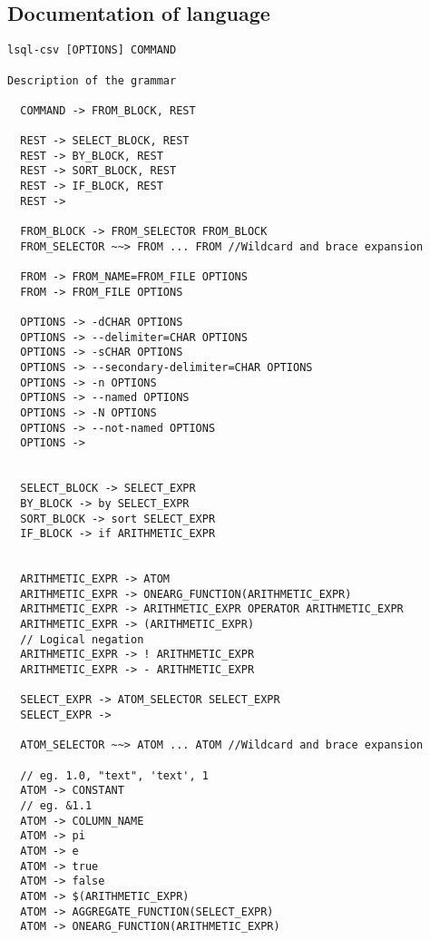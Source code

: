 \subsection{Documentation of language}
\begin{verbatim}
lsql-csv [OPTIONS] COMMAND
      
Description of the grammar
  
  COMMAND -> FROM_BLOCK, REST
                            
  REST -> SELECT_BLOCK, REST 
  REST -> BY_BLOCK, REST   
  REST -> SORT_BLOCK, REST 
  REST -> IF_BLOCK, REST   
  REST ->
  
  FROM_BLOCK -> FROM_SELECTOR FROM_BLOCK
  FROM_SELECTOR ~~> FROM ... FROM //Wildcard and brace expansion
  
  FROM -> FROM_NAME=FROM_FILE OPTIONS
  FROM -> FROM_FILE OPTIONS
  
  OPTIONS -> -dCHAR OPTIONS
  OPTIONS -> --delimiter=CHAR OPTIONS
  OPTIONS -> -sCHAR OPTIONS
  OPTIONS -> --secondary-delimiter=CHAR OPTIONS
  OPTIONS -> -n OPTIONS  
  OPTIONS -> --named OPTIONS
  OPTIONS -> -N OPTIONS   
  OPTIONS -> --not-named OPTIONS
  OPTIONS ->
  
  
  SELECT_BLOCK -> SELECT_EXPR
  BY_BLOCK -> by SELECT_EXPR
  SORT_BLOCK -> sort SELECT_EXPR                                                                                                                              
  IF_BLOCK -> if ARITHMETIC_EXPR
  
                                                                                                                 
  ARITHMETIC_EXPR -> ATOM  
  ARITHMETIC_EXPR -> ONEARG_FUNCTION(ARITHMETIC_EXPR)                                                                                                                                            
  ARITHMETIC_EXPR -> ARITHMETIC_EXPR OPERATOR ARITHMETIC_EXPR
  ARITHMETIC_EXPR -> (ARITHMETIC_EXPR)
  // Logical negation
  ARITHMETIC_EXPR -> ! ARITHMETIC_EXPR
  ARITHMETIC_EXPR -> - ARITHMETIC_EXPR
  
  SELECT_EXPR -> ATOM_SELECTOR SELECT_EXPR                                                                                                                                     
  SELECT_EXPR ->
  
  ATOM_SELECTOR ~~> ATOM ... ATOM //Wildcard and brace expansion
  
  // eg. 1.0, "text", 'text', 1
  ATOM -> CONSTANT
  // eg. &1.1
  ATOM -> COLUMN_NAME
  ATOM -> pi   
  ATOM -> e
  ATOM -> true
  ATOM -> false
  ATOM -> $(ARITHMETIC_EXPR)
  ATOM -> AGGREGATE_FUNCTION(SELECT_EXPR)
  ATOM -> ONEARG_FUNCTION(ARITHMETIC_EXPR)


\end{verbatim}
